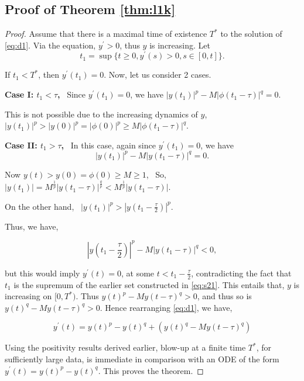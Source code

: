 \documentclass[sn-mathphys-num]{sn-jnl}
\numberwithin{equation}{section}
\numberwithin{equation}{section}
\begin{document}
\subsection{Proof of Theorem \ref{thm:l1k}}
\begin{proof}
\label{proof_thm:l1k}
Assume that there is a maximal time of existence $T^{*}$ to the solution of \eqref{eq:d1}. Via the equation, $y^{'} > 0$, thus $y$ is increasing. Let \begin{equation}
\label{eq:s21}
    t_{1} = \sup \{ t \geq 0, y^{'}(s) > 0, s \in [0,t] \}.
\end{equation} 

If $t_{1} < T^{*}$, then $y^{'}(t_{1}) = 0$. Now, let us consider 2 cases.

\textbf{Case I: $t_{1} < \tau$,} \ Since $y^{'}(t_{1}) = 0$, we have 
$|y(t_{1})|^{p} - M|\phi(t_{1}-\tau)|^{q} = 0.$

This is not possible due to the increasing dynamics of $y$, 
$|y(t_{1})|^{p} > |y(0)|^{p} = |\phi(0)|^{p}  \geq M|\phi(t_{1}-\tau)|^{q}.$


\textbf{Case II: $t_{1} > \tau$,} \ In this case, again since $y^{'}(t_{1}) = 0$, we have 
\begin{equation}
|y(t_{1})|^{p} - M|y(t_{1}-\tau)|^{q} = 0.
\end{equation}

Now $y(t) > y(0) = \phi(0) \geq M \geq 1$, \ So, $
|y(t_{1})| = M^{\frac{1}{p}}|y(t_{1}-\tau)|^{\frac{q}{p}} < M^{\frac{1}{p}}|y(t_{1}-\tau)|. 
$
\

On the other hand, \ $
|y(t_{1})|^{p} > |y\left(t_{1}-\frac{\tau}{2}\right)|^{p}. 
$

Thus, we have, 

\begin{equation}
|y\left(t_{1}-\frac{\tau}{2}\right)|^{p} - M|y(t_{1}-\tau)|^{q} < 0, 
\end{equation}

but this would imply $y^{'}(t) = 0$, at some $t < t_{1}-\frac{\tau}{2}$, contradicting the fact that $t_{1}$ is the supremum of the earlier set constructed in \eqref{eq:s21}. This entails that, $y$ is increasing on $[0,T^{*})$. Thus $y(t)^{p} - M y(t-\tau)^{q} > 0$, and thus so is $y(t)^{q} - M y(t-\tau)^{q} > 0$. Hence rearranging \eqref{eq:d1}, we have,


\begin{equation}
y^{'}(t) = y(t)^{p} - y(t)^{q} + \left( y(t)^{q} - M y(t-\tau)^{q} \right)
\end{equation}

Using the positivity results derived earlier, blow-up at a finite time $T^{*}$, for sufficiently large data, is immediate in comparison with an ODE of the form
$y^{'}(t) = y(t)^{p} - y(t)^{q}$. 
This proves the theorem.
\end{proof}
\end{document}
